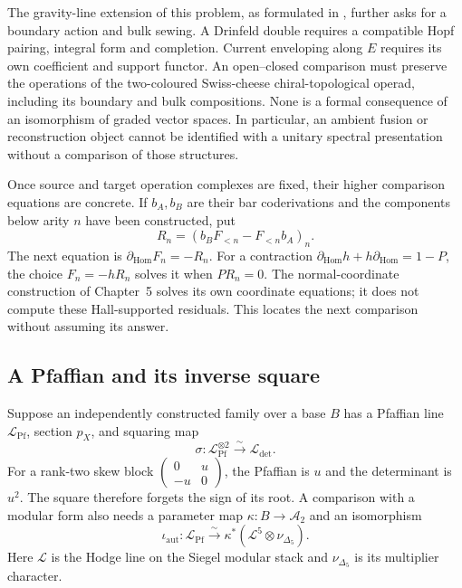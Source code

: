 The gravity-line extension of this problem, as formulated in
\cite{ChiralBarCobarVolII}, further asks for a boundary action
and bulk sewing.  A Drinfeld double requires a compatible Hopf
pairing, integral form and completion.  Current enveloping along
\(E\) requires its own coefficient and support functor.  An
open--closed comparison must preserve the operations of the
two-coloured Swiss-cheese chiral-topological operad, including
its boundary and bulk compositions.  None is a formal consequence
of an isomorphism of graded vector spaces.  In particular, an
ambient fusion or reconstruction object cannot be identified
with a unitary spectral presentation without a comparison of
those structures.

Once source and target operation complexes are fixed, their
higher comparison equations are concrete.  If \(b_A,b_B\) are
their bar coderivations and the components below arity \(n\)
have been constructed, put
\[
 R_n=(b_BF_{<n}-F_{<n}b_A)_n.
\]
The next equation is
\(\partial_{\mathrm{Hom}}F_n=-R_n\).
For a contraction
\(\partial_{\mathrm{Hom}}h+h\partial_{\mathrm{Hom}}=1-P\),
the choice \(F_n=-hR_n\) solves it when \(PR_n=0\).
The normal-coordinate construction of Chapter~5 solves its own
coordinate equations; it does not compute these Hall-supported
residuals.  This locates the next comparison without assuming
its answer.

\subsection{A Pfaffian and its inverse square}
\label{subsec:zbps-pfaffian-comparison}

Suppose an independently constructed family over a base \(B\)
has a Pfaffian line \(\mathscr L_{\mathrm{Pf}}\), section
\(p_X\), and squaring map
\[
 \sigma:\mathscr L_{\mathrm{Pf}}^{\otimes2}
                  \xrightarrow{\sim}\mathscr L_{\det}.
\]
For a rank-two skew block
\(\left(\begin{smallmatrix}0&u\\-u&0\end{smallmatrix}\right)\),
the Pfaffian is \(u\) and the determinant is \(u^2\).
The square therefore forgets the sign of its root.  A comparison
with a modular form also needs a parameter map
\(\kappa:B\to\mathcal A_2\) and an isomorphism
\[
 \iota_{\mathrm{aut}}:\mathscr L_{\mathrm{Pf}}
       \xrightarrow{\sim}\kappa^*(\mathcal L^5\otimes\nu_{\Delta_5}).
\]
Here \(\mathcal L\) is the Hodge line on the Siegel modular
stack and \(\nu_{\Delta_5}\) is its multiplier character.

